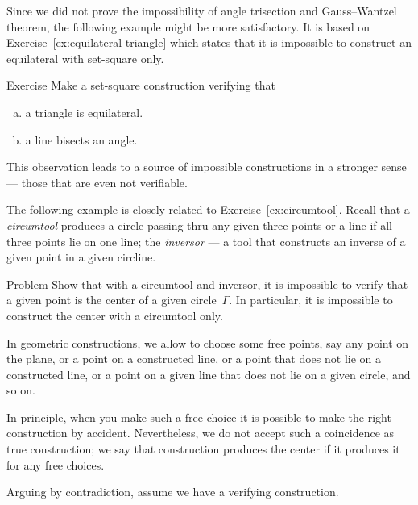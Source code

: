 Since we did not prove the impossibility of angle trisection and Gauss--Wantzel theorem, the following example might be more satisfactory.
It is based on Exercise~\ref{ex:equilateral triangle} which states that it is impossible to construct an equilateral with set-square only.

\begin{thm}{Exercise}\label{ex:equilateral triangle-verify}
Make a set-square construction verifying that 
\begin{enumerate}[(a)]
\item\label{ex:verify:triangle} a triangle is equilateral.
\item\label{ex:verify:bisector} a line bisects an angle.
\end{enumerate}
\end{thm}

This observation leads to a source of impossible constructions in a stronger sense --- those that are even not verifiable.

The following example is closely related to Exercise~\ref{ex:circumtool}.
Recall that a \emph{circumtool} produces a circle passing thru any given three points
or a line if all three points lie on one line;
the \emph{inversor} --- a tool that constructs an inverse of a given point in a given circline.


\begin{thm}{Problem}\label{prob:center-inversor+circumtool}
Show that with a circumtool and inversor,
it is impossible to verify that a given point is the center of a given circle~$\Gamma$.
In particular, it is impossible to construct the center with a circumtool only.
\end{thm}

In geometric constructions, we allow to choose some free points,
say any point on the plane, or a point on a constructed line, or a point that does not lie on a constructed line, 
or a point on a given line that does not lie on a given circle, and so on.

In principle, when you make such a free choice it is possible to make the right construction by accident.
Nevertheless, we do not accept such a coincidence as true construction; 
we say that construction produces the center if it produces it for any free choices.


\label{page:solution-for-ex:circumtool}
Arguing by contradiction, 
assume we have a verifying construction. 

